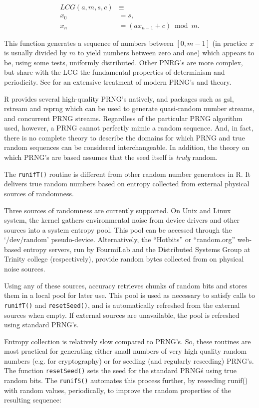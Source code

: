 \documentclass[11pt]{article}
\let\code=\texttt
\let\proglang=\textsf
\newcommand{\pkg}[1]{{\normalfont\fontseries{b}\selectfont #1}}
\begin{document}
\begin{align}\label{Congruential.Generator}
    LCG(a,m,s,c)&\equiv \nonumber\\
            x_{0} &=s,  \nonumber\\
            x_{n} &=(ax_{n-1}+c)\bmod{m}.
\end{align} 

This function generates a sequence of numbers between $[0,m-1]$ (in practice $x$ is usually divided by $m$ to yield numbers between zero and one) which appears to be, using some tests, uniformly distributed. Other PNRG's are more complex, but share with the LCG the fundamental properties of determinism and periodicity. See \cite{Gentle98} for an extensive treatment of modern PRNG's and theory.

\proglang{R} provides several high-quality PRNG's natively, and packages such as 
\pkg{gsl}, \pkg{rstream} and \pkg{rsprng} which can be used to generate
quasi-random number streams, and concurrent PRNG streams.
Regardless of the particular PRNG algorithm used, however, a PRNG cannot
perfectly mimic a random sequence. And, in fact, there is no complete
theory to describe the domains for which PRNG and true random sequences 
can be considered interchangeable. In addition, the theory
on which PRNG's are based assumes that the seed itself is \emph{truly} random.

The \code{runifT()} routine is different from other random number generators in R. 
It delivers true random numbers based on
entropy collected from external physical sources of randomness.

Three sources of randomness are currently supported. On Unix and Linux system, the kernel gathers environmental noise from 
device drivers and other sources into a system entropy pool.
This pool can be accessed through the `/dev/random' pseudo-device.
Alternatively, the ``Hotbits'' or ``random.org'' web-based
entropy servers, run by FourmiLab and the Distributed Systems Group
at Trinity college (respectively), provide random bytes collected from on physical noise sources.

Using any of these sources, \pkg{accuracy} retrieves chunks of random bits and stores them in a local pool for later use. This pool is used as necessary to 
 satisfy calls to \code{runifT()} and \code{resetSeed()},
 and is automatically refreshed from the external sources when empty. 
 If external sources are unavailable, the pool is refreshed using standard PRNG's.

Entropy collection is relatively slow compared to PRNG's. So, these routines
are most practical for generating either small numbers of very high quality random
numbers (e.g. for cryptography) or for seeding (and regularly reseeding) PRNG's. 
The function \code{resetSeed()} sets the seed for the standard PRNG\'s using
true random bits. The \code{runifS()} automates this process further, by reseeding 
runif() with random values, periodically, to improve the random properties of the
 resulting sequence:
\end{document}
